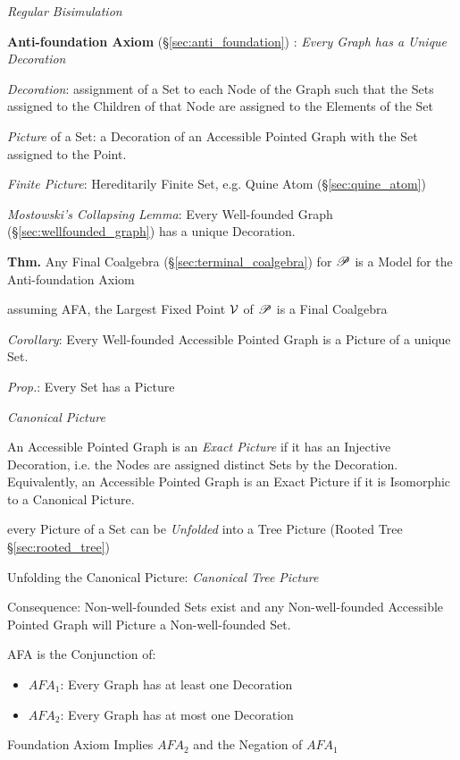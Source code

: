 \emph{Regular Bisimulation} %



\textbf{Anti-foundation Axiom} (\S\ref{sec:anti_foundation})
\cite{aczel88}: \emph{Every Graph has a Unique Decoration}

\emph{Decoration}: assignment of a Set to each Node of the Graph such
that the Sets assigned to the Children of that Node are assigned to
the Elements of the Set

\emph{Picture} of a Set: a Decoration of an Accessible Pointed Graph
with the Set assigned to the Point.

\emph{Finite Picture}: Hereditarily Finite Set, e.g. Quine Atom
(\S\ref{sec:quine_atom})

\emph{Mostowski's Collapsing Lemma}: Every Well-founded Graph
(\S\ref{sec:wellfounded_graph}) has a unique Decoration.

\textbf{Thm.} Any Final Coalgebra (\S\ref{sec:terminal_coalgebra}) for
$\mathscr{P}$ is a Model for the Anti-foundation Axiom

assuming AFA, the Largest Fixed Point $\mathcal{V}$ of $\mathscr{P}$ is a Final
Coalgebra

\emph{Corollary}: Every Well-founded Accessible Pointed Graph is a
Picture of a unique Set.

\emph{Prop.}: Every Set has a Picture

\emph{Canonical Picture}

An Accessible Pointed Graph is an \emph{Exact Picture} if it has an
Injective Decoration, i.e. the Nodes are assigned distinct Sets by the
Decoration. Equivalently, an Accessible Pointed Graph is an Exact
Picture if it is Isomorphic to a Canonical Picture.

every Picture of a Set can be \emph{Unfolded} into a Tree Picture
(Rooted Tree \S\ref{sec:rooted_tree})

Unfolding the Canonical Picture: \emph{Canonical Tree Picture}

Consequence: Non-well-founded Sets exist and any Non-well-founded
Accessible Pointed Graph will Picture a Non-well-founded Set.

AFA is the Conjunction of:
\begin{itemize}
  \item $AFA_1$: Every Graph has at least one Decoration
  \item $AFA_2$: Every Graph has at most one Decoration
\end{itemize}

Foundation Axiom Implies $AFA_2$ and the Negation of $AFA_1$

